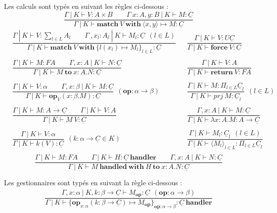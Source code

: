 	Les calculs sont typés en suivant les règles ci-dessous :
	\[\dfrac{\Gamma~|~K \vdash V : A \times B\quad\quad\Gamma~x:A,y:B~|~K \vdash M:\underline{C}}{\Gamma~|~K \vdash \textbf{match}~V~\textbf{with}~\langle x,y\rangle  \mapsto M:\underline{C}}\]
	\begin{align*}	
		&\dfrac{\Gamma~|~K \vdash V : \sum_{l \in L}A_l\quad\quad\Gamma~,x_l:A_l~|~K \vdash M_l:\underline{C}~~(l\in L)}{\Gamma~|~K \vdash \textbf{match}~V~\textbf{with}~\{ l(x_l) \mapsto M_l\}_{l \in L}:\underline{C}} &
		&\dfrac{\Gamma~|~K \vdash V : U\underline{C}}{\Gamma~|~K \vdash \textbf{force}~V:\underline{C}}\\\\
		&\dfrac{\Gamma~|~K \vdash M:FA\quad\quad\Gamma,x:A~|~K \vdash N:\underline{C}}{\Gamma~|~K \vdash M~\textbf{to}~x:A.N:\underline{C}} &
		&\dfrac{\Gamma~|~K \vdash V : A}{\Gamma~|~K \vdash \textbf{return}~V:FA}\\\\
		&\dfrac{\Gamma~|~K \vdash V:\alpha\quad\quad\Gamma,x:\beta~|~K \vdash M : \underline{C}}{\Gamma~|~K \vdash \textbf{op}_V(x:\beta.M):\underline{C}}~~(\textbf{op}:\alpha \rightarrow \beta) &
		&\dfrac{\Gamma~|~K \vdash M : \Pi_{l\in L} \underline{C}_l}{\Gamma~|~K \vdash prj~M:\underline{C}_l}~~(l \in L) \\\\
		&\dfrac{\Gamma~|~K \vdash M : A \rightarrow \underline{C}\quad\quad\Gamma~|~K \vdash V:A }{\Gamma~|~K \vdash M~V:\underline{C}  } &
		&\dfrac{\Gamma,x:A~|~K \vdash M : \underline{C}}{\Gamma~|~K \vdash \lambda x:A.M:A \rightarrow \underline{C}} \\\\
		&\dfrac{\Gamma~|~K \vdash V:\alpha}{\Gamma~|~K \vdash k(V):\underline{C}}~~(k:\alpha \rightarrow \underline{C} \in K) &
		&\dfrac{\Gamma~|~K \vdash M_l:\underline{C}_l~~(l \in L)}{\Gamma~|~K \vdash \langle M_l\rangle_{l \in L}:\Pi_{l\in L}\underline{C}_l}\\
	\end{align*}
	\[\dfrac{\Gamma~|~K \vdash M:FA\quad\quad\Gamma~|~K \vdash H : \underline{C}~\textbf{handler}\quad\quad\Gamma,x:A~|~K \vdash N:\underline{C}}{\Gamma~|~K \vdash M~\textbf{handled}~\textbf{with}~H~\textbf{to}~x:A.N : \underline{C}}\]	
	
	
	Les gestionnaires sont typés en suivant la règle ci-dessous : 
	\begin{align*}
		\dfrac{\Gamma,x:\alpha~|~K,k:\beta \rightarrow \underline{C} \vdash M_\textbf{op}:\underline{C}~~(\textbf{op}: \alpha \rightarrow \beta)}{\Gamma~|~K \vdash \{\textbf{op}_{x : \alpha}(k:\beta \rightarrow \underline{C}) \mapsto M_\textbf{op}\}_{\textbf{op}:\alpha \rightarrow \beta}:\underline{C}~\textbf{handler}}
	\end{align*}


